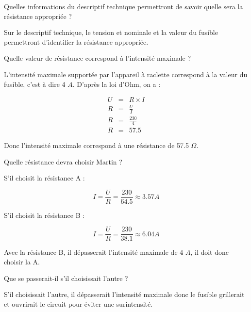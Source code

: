 \begin{questions}
	\question[1] Quelles informations du descriptif technique permettront de savoir quelle sera la résistance appropriée ?
	\begin{solution}
		Sur le descriptif technique, le tension et nominale et la valeur du fusible permettront d'identifier la résistance appropriée.
	\end{solution}
	
	\question[1\half] Quelle valeur de résistance correspond à l'intensité maximale ?
	\begin{solution}
		L'intensité maximale supportée par l'appareil à raclette correspond à la valeur du fusible, c'est à dire 4 $A$. D'après la loi d'Ohm, on a :
		
		\begin{eqnarray*}
			U &=& R \times I \\
			R &=& \frac{U}{I} \\
			R &=& \frac{230}{4} \\
			R &=& \num{57.5}
		\end{eqnarray*}
	
	Donc l'intensité maximale correspond à une résistance de \num{57.5} $\Omega$.
	\end{solution}
	
	\question[1\half] Quelle résistance devra choisir Martin ?
	\begin{solution}
		
		S'il choisit la résistance A :
		
		\begin{equation}
			I = \frac{U}{R} = \frac{230}{\num{64.5}} \approx \num{3.57} A
		\end{equation}
		
		S'il choisit la résistance B :
		
		\begin{equation}
		I = \frac{U}{R} = \frac{230}{\num{38.1}} \approx \num{6.04} A
		\end{equation}
		
		Avec la résistance B, il dépasserait l'intensité maximale de 4 $A$, il doit donc choisir la A.
	\end{solution}
	
	\question[1] Que se passerait-il s'il choisissait l'autre ?
	\begin{solution}
		S'il choisissait l'autre, il dépasserait l'intensité maximale donc le fusible grillerait et ouvrirait le circuit pour éviter une surintensité.
	\end{solution}
\end{questions}